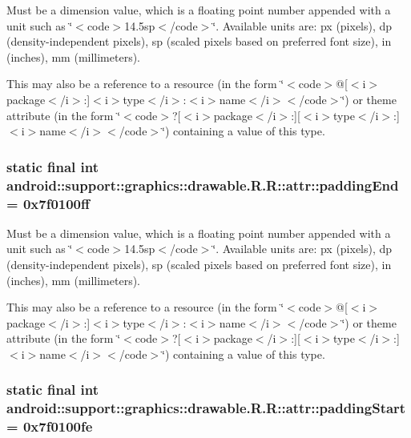 Must be a dimension value, which is a floating point number appended with a unit such as \char`\"{}$<$code$>$14.5sp$<$/code$>$\char`\"{}. Available units are: px (pixels), dp (density-independent pixels), sp (scaled pixels based on preferred font size), in (inches), mm (millimeters). 

This may also be a reference to a resource (in the form \char`\"{}$<$code$>$@\mbox{[}$<$i$>$package$<$/i$>$:\mbox{]}$<$i$>$type$<$/i$>$:$<$i$>$name$<$/i$>$$<$/code$>$\char`\"{}) or theme attribute (in the form \char`\"{}$<$code$>$?\mbox{[}$<$i$>$package$<$/i$>$:\mbox{]}\mbox{[}$<$i$>$type$<$/i$>$:\mbox{]}$<$i$>$name$<$/i$>$$<$/code$>$\char`\"{}) containing a value of this type. \hypertarget{classandroid_1_1support_1_1graphics_1_1drawable_1_1_r_1_1attr_b549df6cccbcf6ceddb8823771296e70}{
\subsubsection[{paddingEnd}]{\setlength{\rightskip}{0pt plus 5cm}static final int android::support::graphics::drawable.R.R::attr::paddingEnd = 0x7f0100ff}}
\label{classandroid_1_1support_1_1graphics_1_1drawable_1_1_r_1_1attr_b549df6cccbcf6ceddb8823771296e70}


Must be a dimension value, which is a floating point number appended with a unit such as \char`\"{}$<$code$>$14.5sp$<$/code$>$\char`\"{}. Available units are: px (pixels), dp (density-independent pixels), sp (scaled pixels based on preferred font size), in (inches), mm (millimeters). 

This may also be a reference to a resource (in the form \char`\"{}$<$code$>$@\mbox{[}$<$i$>$package$<$/i$>$:\mbox{]}$<$i$>$type$<$/i$>$:$<$i$>$name$<$/i$>$$<$/code$>$\char`\"{}) or theme attribute (in the form \char`\"{}$<$code$>$?\mbox{[}$<$i$>$package$<$/i$>$:\mbox{]}\mbox{[}$<$i$>$type$<$/i$>$:\mbox{]}$<$i$>$name$<$/i$>$$<$/code$>$\char`\"{}) containing a value of this type. \hypertarget{classandroid_1_1support_1_1graphics_1_1drawable_1_1_r_1_1attr_1783e1c72b921c814fb3657bd317850c}{
\subsubsection[{paddingStart}]{\setlength{\rightskip}{0pt plus 5cm}static final int android::support::graphics::drawable.R.R::attr::paddingStart = 0x7f0100fe}}
\label{classandroid_1_1support_1_1graphics_1_1drawable_1_1_r_1_1attr_1783e1c72b921c814fb3657bd317850c}


